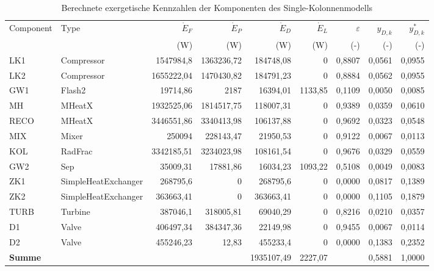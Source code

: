 \begin{longtable}{llrrrrrrr}
\caption{Berechnete exergetische Kennzahlen der Komponenten des Single-Kolonnenmodells} \\
\hline
Component & Type & $\dot{E}_F$ & $\dot{E}_P$ & $\dot{E}_D$ & $\dot{E}_L$ & $\varepsilon$ & $y_{D,k}$ & $y^*_{D,k}$ \\
 &  & (W) & (W) & (W) & (W) & (-) & (-) & (-) \\
\hline
LK1 & Compressor & 1547984,8 & 1363236,72 & 184748,08 & 0 & 0,8807 & 0,0561 & 0,0955 \\
LK2 & Compressor & 1655222,04 & 1470430,82 & 184791,23 & 0 & 0,8884 & 0,0562 & 0,0955 \\
GW1 & Flash2 & 19714,86 & 2187 & 16394,01 & 1133,85 & 0,1109 & 0,0050 & 0,0085 \\
MH & MHeatX & 1932525,06 & 1814517,75 & 118007,31 & 0 & 0,9389 & 0,0359 & 0,0610 \\
RECO & MHeatX & 3446551,86 & 3340413,98 & 106137,88 & 0 & 0,9692 & 0,0323 & 0,0548 \\
MIX & Mixer & 250094 & 228143,47 & 21950,53 & 0 & 0,9122 & 0,0067 & 0,0113 \\
KOL & RadFrac & 3342185,51 & 3234023,98 & 108161,54 & 0 & 0,9676 & 0,0329 & 0,0559 \\
GW2 & Sep & 35009,31 & 17881,86 & 16034,23 & 1093,22 & 0,5108 & 0,0049 & 0,0083 \\
ZK1 & SimpleHeatExchanger & 268795,6 & 0 & 268795,6 & 0 & 0,0000 & 0,0817 & 0,1389 \\
ZK2 & SimpleHeatExchanger & 363663,41 & 0 & 363663,41 & 0 & 0,0000 & 0,1105 & 0,1879 \\
TURB & Turbine & 387046,1 & 318005,81 & 69040,29 & 0 & 0,8216 & 0,0210 & 0,0357 \\
D1 & Valve & 406497,34 & 384347,36 & 22149,98 & 0 & 0,9455 & 0,0067 & 0,0114 \\
D2 & Valve & 455246,23 & 12,83 & 455233,4 & 0 & 0,0000 & 0,1383 & 0,2352 \\
\hline
\textbf{Summe} &  &  &  & 1935107,49 & 2227,07 &  & 0,5881 & 1,0000 \\
\hline
\end{longtable}
